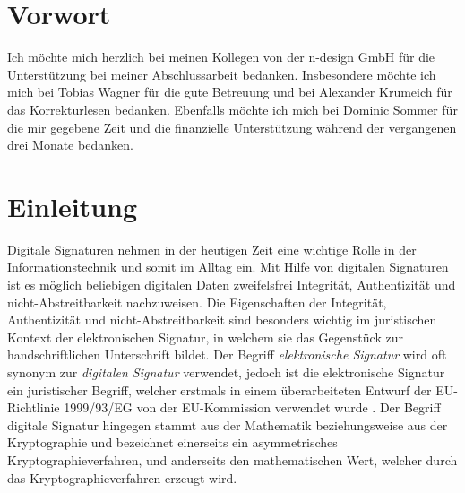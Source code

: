 \documentclass[11pt,a4paper,ngerman]{scrreprt}
\begin{document}
\maketitle



\chapter*{Vorwort}
Ich möchte mich herzlich bei meinen Kollegen von der n-design GmbH für die Unterstützung bei meiner Abschlussarbeit bedanken. Insbesondere möchte ich mich bei Tobias Wagner für die gute Betreuung und bei Alexander Krumeich für das Korrekturlesen bedanken. Ebenfalls möchte ich mich bei Dominic Sommer für die mir gegebene Zeit und die finanzielle Unterstützung während der vergangenen drei Monate bedanken.
\clearpage

\tableofcontents
\clearpage


\chapter{Einleitung}
Digitale Signaturen nehmen in der heutigen Zeit eine wichtige Rolle in der Informationstechnik und somit im Alltag ein. Mit Hilfe von digitalen Signaturen ist es möglich beliebigen digitalen Daten zweifelsfrei Integrität, Authentizität und nicht-Abstreitbarkeit nachzuweisen. Die Eigenschaften der Integrität, Authentizität und nicht-Abstreitbarkeit sind besonders wichtig im juristischen Kontext der elektronischen Signatur, in welchem sie das Gegenstück zur handschriftlichen Unterschrift bildet. Der Begriff \emph{elektronische Signatur} wird oft synonym zur \emph{digitalen Signatur} verwendet, jedoch ist die elektronische Signatur ein juristischer Begriff, welcher erstmals in einem überarbeiteten Entwurf der EU-Richtlinie 1999/93/EG von der EU-Kommission verwendet wurde \cite{eSigEU99}. Der Begriff digitale Signatur hingegen stammt aus der Mathematik beziehungsweise aus der Kryptographie und bezeichnet einerseits ein asymmetrisches Kryptographieverfahren, und anderseits den mathematischen Wert, welcher durch das Kryptographieverfahren erzeugt wird.
\end{document}
